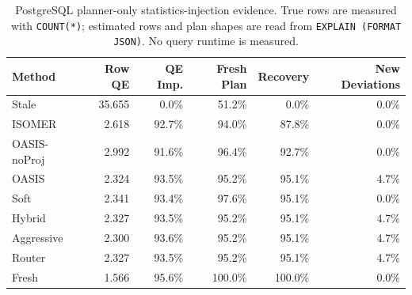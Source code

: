 \begin{table}[t]
  \centering
  \small
  \caption{PostgreSQL planner-only statistics-injection evidence. True rows are measured with \texttt{COUNT(*)}; estimated rows and plan shapes are read from \texttt{EXPLAIN (FORMAT JSON)}. No query runtime is measured.}
  \label{tab:postgres_planner_stats_injection}
  \setlength{\tabcolsep}{4pt}
  \begin{tabular}{lrrrrr}
    \toprule
    Method & Row QE & QE Imp. & Fresh Plan & Recovery & New Deviations \\
    \midrule
    Stale & 35.655 & 0.0\% & 51.2\% & 0.0\% & 0.0\% \\
    ISOMER & 2.618 & 92.7\% & 94.0\% & 87.8\% & 0.0\% \\
    OASIS-noProj & 2.992 & 91.6\% & 96.4\% & 92.7\% & 0.0\% \\
    OASIS & 2.324 & 93.5\% & 95.2\% & 95.1\% & 4.7\% \\
    Soft & 2.341 & 93.4\% & 97.6\% & 95.1\% & 0.0\% \\
    Hybrid & 2.327 & 93.5\% & 95.2\% & 95.1\% & 4.7\% \\
    Aggressive & 2.300 & 93.6\% & 95.2\% & 95.1\% & 4.7\% \\
    Router & 2.327 & 93.5\% & 95.2\% & 95.1\% & 4.7\% \\
    Fresh & 1.566 & 95.6\% & 100.0\% & 100.0\% & 0.0\% \\
    \bottomrule
  \end{tabular}
\end{table}
